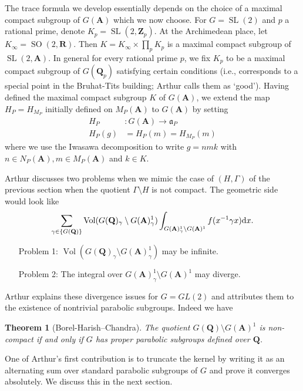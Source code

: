\documentclass[11pt]{amsart}
\def\A{\mathbf A}
\def\Q{\mathbf Q}
\def\R{\mathbf R}
\def\Z{\mathbf Z}
\def\aaa{\mathfrak a}
\def\d{\text d}
\def\bs{\setminus}
\def\sl{\operatorname{SL}}
\def\so{\operatorname{SO}}
\def\vol{\operatorname{Vol}}
\newtheorem{theorem}{Theorem}[section]
\theoremstyle{remark}
\begin{document}
The trace formula we develop essentially depends on the choice of a maximal compact subgroup of $G(\A)$ which we now choose. For $G = \sl(2)$ and $p$ a rational prime, denote $K_p = \sl(2, \Z_p)$. At the Archimedean place, let $K_\infty = \so(2, \R)$. Then $K = K_\infty \times \prod_p K_p$ is a maximal compact subgroup of $\sl(2, \A)$. In general for every rational prime $p$, we fix $K_p$ to be a maximal compact subgroup of $G(\Q_p)$ satisfying certain conditions (i.e., corresponds to a special point in the Bruhat-Tits building; Arthur calls them as `good'). Having defined the maximal compact subgroup $K$ of $G(\A)$, we extend the map $H_P = H_{M_P}$ initially defined on $M_P(\A)$ to $G(\A)$ by setting
\begin{align*}
	H_P & : G(\A) \to \aaa_P \\
	H_P(g) & = H_P(m) = H_{M_P}(m)
\end{align*} 
where we use the Iwasawa decomposition to write $g = nmk$ with $n \in N_P(\A), m \in M_P(\A)$ and $k \in K$. 

Arthur discusses two problems when we mimic the case of $(H, \Gamma)$ of the previous section when the quotient $\Gamma\bs H$ is not compact. The geometric side would look like 
\[ \sum_{\gamma \in \{G(\Q)\}} \vol(G(\Q)_\gamma\bs G(\A)_\gamma^1) \int_{G(\A)^1_\gamma \bs G(\A)^1} f(x^{-1}\gamma x) \d x.\]

\begin{itemize}
\item[Problem 1:] $\vol(G(\Q)_\gamma\bs G(\A)_\gamma^1)$ may be infinite. 
\item[Problem 2:] The integral over $G(\A)^1_\gamma \bs G(\A)^1$ may diverge. 
\end{itemize}

Arthur explains these divergence issues for $G = GL(2)$ and attributes them to the existence of nontrivial parabolic subgroups. Indeed we have

\begin{theorem} [Borel-Harish--Chandra]
The quotient $G(\Q)\bs G(\A)^1$ is non-compact if and only if $G$ has proper parabolic subgroups defined over $\Q$. 
\end{theorem}

One of Arthur's first contribution is to truncate the kernel by writing it as an alternating sum over standard parabolic subgroups of $G$ and prove it converges absolutely. We discuss this in the next section. 

\end{document}
